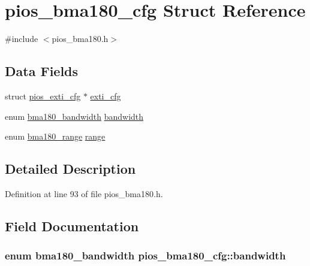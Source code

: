 \hypertarget{structpios__bma180__cfg}{\section{pios\-\_\-bma180\-\_\-cfg Struct Reference}
\label{structpios__bma180__cfg}
}


{\ttfamily \#include $<$pios\-\_\-bma180.\-h$>$}

\subsection*{Data Fields}
\begin{DoxyCompactItemize}
\item 
struct \hyperlink{structpios__exti__cfg}{pios\-\_\-exti\-\_\-cfg} $\ast$ \hyperlink{structpios__bma180__cfg_a1fc7acd142e861f02f5f8a5b9364bedf}{exti\-\_\-cfg}
\item 
enum \hyperlink{group___p_i_o_s___b_m_a180_gacd6d3ecff286f705778973637b4d3d99}{bma180\-\_\-bandwidth} \hyperlink{structpios__bma180__cfg_aff39543f8f282ae9daba6cb6e3500f7f}{bandwidth}
\item 
enum \hyperlink{group___p_i_o_s___b_m_a180_ga319b0b37d7184097d2ae4e7ba527a416}{bma180\-\_\-range} \hyperlink{structpios__bma180__cfg_ab6de89aba289da9930b188f183765921}{range}
\end{DoxyCompactItemize}


\subsection{Detailed Description}


Definition at line 93 of file pios\-\_\-bma180.\-h.



\subsection{Field Documentation}
\hypertarget{structpios__bma180__cfg_aff39543f8f282ae9daba6cb6e3500f7f}{
\subsubsection[{bandwidth}]{\setlength{\rightskip}{0pt plus 5cm}enum {\bf bma180\-\_\-bandwidth} pios\-\_\-bma180\-\_\-cfg\-::bandwidth}}\label{structpios__bma180__cfg_aff39543f8f282ae9daba6cb6e3500f7f}



